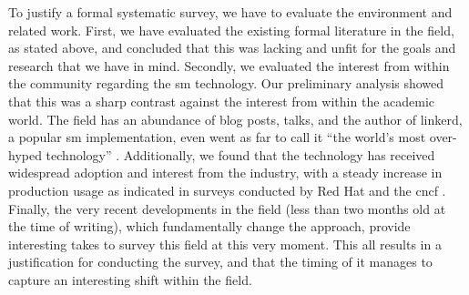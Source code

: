 To justify a formal systematic survey, we have to evaluate the environment and related work. First, we have evaluated the existing formal literature in the field, as stated above, and concluded that this was lacking and unfit for the goals and research that we have in mind. Secondly, we evaluated the interest from within the community regarding the \gls{sm} technology. Our preliminary analysis showed that this was a sharp contrast against the interest from within the academic world. The field has an abundance of blog posts, talks, and the author of \gls{linkerd}, a popular \gls{sm} implementation, even went as far to call it “the world’s most over-hyped technology” \cite{service-mesh-hype}. Additionally, we found that the technology has received widespread adoption and interest from the industry, with a steady increase in production usage as indicated in surveys conducted by Red Hat \cite{rh-survey} and the \gls{cncf} \cite{cncf-survey-2020}. Finally, the very recent developments \cite{istio-merbridge, cilium-mesh} in the field (less than two months old at the time of writing), which fundamentally change the approach, provide  interesting takes to survey this field at this very moment. This all results in a justification for conducting the survey, and that the timing of it manages to capture an interesting shift within the field.

